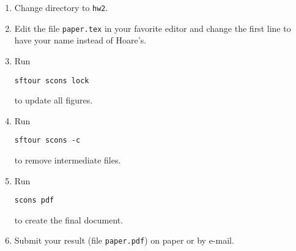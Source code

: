 \begin{enumerate}
\item Change directory to \texttt{hw2}.
\item Edit the file \texttt{paper.tex} in your favorite editor and change the
  first line to have your name instead of Hoare's.
\item Run
\begin{verbatim}
sftour scons lock
\end{verbatim}
to update all figures.
\item Run
\begin{verbatim}
sftour scons -c
\end{verbatim}
to remove intermediate files.
\item Run
\begin{verbatim}
scons pdf
\end{verbatim}
to create the final document.
\item Submit your result (file \texttt{paper.pdf}) on paper or by
e-mail.
\end{enumerate}
